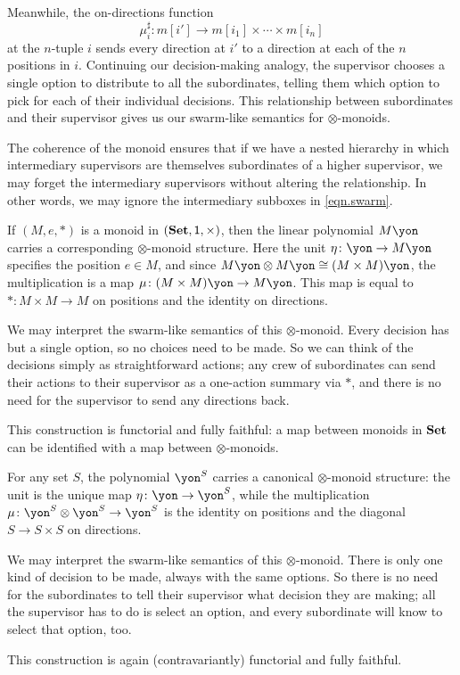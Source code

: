 \documentclass[Book-Poly]{subfiles}
\begin{document}
Meanwhile, the on-directions function
\[
    \mu^\sharp_{i} \colon m[i'] \to m[i_1]\times\cdots\times m[i_n]
\] 
at the $n$-tuple $i$ sends every direction at $i'$ to a direction at each of the $n$ positions in $i$.
Continuing our decision-making analogy, the supervisor chooses a single option to distribute to all the subordinates, telling them which option to pick for each of their individual decisions.
This relationship between subordinates and their supervisor gives us our swarm-like semantics for $\otimes$-monoids.

The coherence of the monoid ensures that if we have a nested hierarchy in which intermediary supervisors are themselves subordinates of a higher supervisor, we may forget the intermediary supervisors without altering the relationship.
In other words, we may ignore the intermediary subboxes in \eqref{eqn.swarm}.

\begin{example}\label{ex.tensor_monoid_linear}
If $(M,e,*)$ is a monoid in $(\mathbf{Set},\textsf{1},\times)$, then the linear polynomial $M\yon$ carries a corresponding $\otimes$-monoid structure.
Here the unit $\eta \colon \yon \to M\yon$ specifies the position $e \in M$, and since $M\yon \otimes M\yon \iso (M \times M)\yon$, the multiplication is a map $\mu \colon (M \times M)\yon \to M\yon$.
This map is equal to $* \colon M \times M \to M$ on positions and the identity on directions.

We may interpret the swarm-like semantics of this $\otimes$-monoid.
Every decision has but a single option, so no choices need to be made.
So we can think of the decisions simply as straightforward actions; any crew of subordinates can send their actions to their supervisor as a one-action summary via $*$, and there is no need for the supervisor to send any directions back.

This construction is functorial and fully faithful: a map between monoids in $\mathbf{Set}$ can be identified with a map between $\otimes$-monoids.
\end{example}

\begin{example}\label{ex.tensor_monoid_rep}
For any set $S$, the polynomial $\yon^S$ carries a canonical $\otimes$-monoid structure: the unit is the unique map $\eta\colon\yon\to\yon^S$, while the multiplication $\mu\colon\yon^S\otimes\yon^S\to\yon^S$ is the identity on positions and the diagonal $S\to S\times S$ on directions.

We may interpret the swarm-like semantics of this $\otimes$-monoid.
There is only one kind of decision to be made, always with the same options.
So there is no need for the subordinates to tell their supervisor what decision they are making; all the supervisor has to do is select an option, and every subordinate will know to select that option, too.

This construction is again (contravariantly) functorial and fully faithful.
\end{example}
\end{document}
